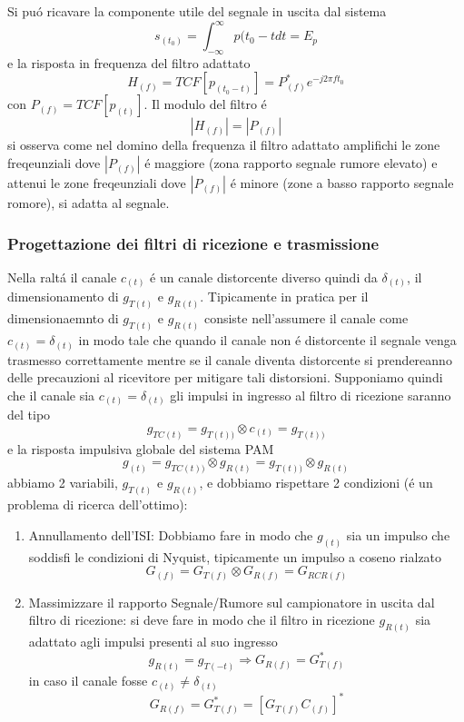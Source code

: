         Si puó ricavare la componente utile del segnale in uscita dal sistema
        \[
            s_{(t_0)} = \int_{-\infty}^{\infty} p{(t_0-t}dt = E_p  
        \]
        e la risposta in frequenza del filtro adattato
        \[
            H_{(f)} = TCF[p_{(t_0-t)}] = P^*_{(f)}e^{-j2\pi ft_0}    
        \]
        con $P_(f) = TCF[p_{(t)}]$. Il modulo del filtro é 
        \[
            \left|H_{(f)}\right| = \left|P_{(f)}\right|   
        \] 
        si osserva come nel domino della frequenza il filtro adattato amplifichi le zone freqeunziali dove $ \left|P_{(f)}\right|$
        é maggiore (zona rapporto segnale rumore elevato) e attenui le zone freqeunziali dove $ \left|P_{(f)}\right|$ é minore 
        (zone a basso rapporto segnale romore), si adatta al segnale.

        \subsubsection{Progettazione dei filtri di ricezione e trasmissione}
            Nella raltá il canale $c_{(t)}$ é un canale distorcente diverso quindi da $\delta_{(t)}$, il dimensionamento di $g_{T(t)}$
            e $g_{R(t)}$. Tipicamente in pratica per il dimensionaemnto di $g_{T(t)}$ e $g_{R(t)}$ consiste nell'assumere il canale 
            come $c_{(t)} = \delta_{(t)}$ in modo tale che quando il canale non é distorcente il segnale venga trasmesso correttamente
            mentre se il canale diventa distorcente si prendereanno delle precauzioni al ricevitore per mitigare tali distorsioni.
            Supponiamo quindi che il canale sia $c_{(t)} = \delta_{(t)}$ gli impulsi in ingresso al filtro di ricezione saranno del tipo
            \[
                g_{TC(t)} = g_{T(t))} \otimes c_{(t)} =  g_{T(t))} 
            \]
            e la risposta impulsiva globale del sistema PAM
            \[
                g_{(t)} = g_{TC(t))} \otimes g_{R(t)} =  g_{T(t))} \otimes g_{R(t)}
            \]
            abbiamo 2 variabili, $g_{T(t)}$ e $g_{R(t)}$, e dobbiamo rispettare 2 condizioni (é un problema di ricerca dell'ottimo):
            \begin{enumerate}
                \item {
                    Annullamento dell'ISI: Dobbiamo fare in modo che $g_{(t)}$ sia un impulso che soddisfi le condizioni di Nyquist,
                    tipicamente un impulso a coseno rialzato
                    \[
                        G_{(f)} = G_{T(f)} \otimes G_{R(f)} = G_{RCR(f)} 
                    \]
                }
                \item {
                    Massimizzare il rapporto Segnale/Rumore sul campionatore in uscita dal filtro di ricezione:
                    si deve fare in modo che il filtro in ricezione $g_{R(t)}$ sia adattato agli impulsi presenti al suo ingresso
                    \[
                        g_{R(t)} = g_{T(-t)} \Rightarrow G_{R(f)} = G_{T(f)}^\ast
                    \]
                    in caso il canale fosse $c_{(t)} \neq \delta_{(t)}$ 
                    \[
                        G_{R(f)} = G_{T(f)}^\ast = \left[G_{T(f)} C_{(f)}\right]^\ast  
                    \]                
                }
            \end{enumerate}

